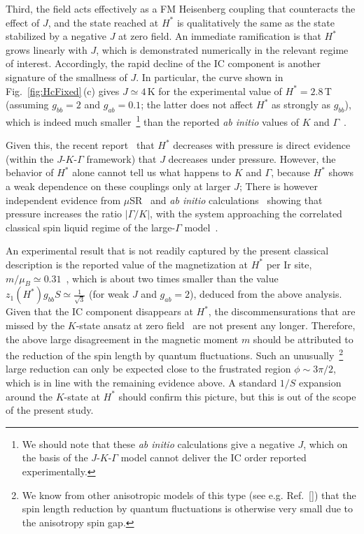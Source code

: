 \documentclass[prx,aps,groupedaddress,twocolumn]{revtex4-1}
\begin{document}
Third, the field acts effectively as a FM Heisenberg coupling that counteracts the effect of $J$, and the state reached at $H^\ast$ is qualitatively the same as the state stabilized by a negative $J$ at zero field.  An immediate ramification is that $H^\ast$ grows linearly with $J$, which is demonstrated numerically in the relevant regime of interest. 
%
Accordingly, the rapid decline of the IC component is another  signature of the smallness of $J$. 
%
In particular, the curve shown in Fig.~\ref{fig:HcFixed}\,(c) gives $J\!\simeq\!4$\,K for the experimental value of $H^\ast\!=\!2.8$\,T~\cite{Ruiz2017} (assuming $g_{bb}\!=\!2$ and $g_{ab}\!=\!0.1$; the latter does not affect $H^\ast$ as strongly as $g_{bb}$), which is indeed much smaller~\footnote{We should note that these {\it ab initio} calculations give a negative $J$, which on the basis of the $J$-$K$-$\Gamma$ model cannot deliver the IC order reported experimentally.} than the reported {\it ab initio} values of $K$ and $\Gamma$~\cite{Katukuri2016,KimKimKee2016, Tsirlin2018}.
%


Given this, the recent report~\cite{Tsirlin2018} that $H^\ast$ decreases with pressure is direct evidence (within the $J$-$K$-$\Gamma$ framework) that $J$ decreases under pressure. 
%
However, the behavior of $H^\ast$ alone cannot tell us what happens to $K$ and $\Gamma$, because $H^\ast$ shows a weak dependence on these couplings only at larger $J$; There is however independent evidence from $\mu$SR~\cite{Tsirlin2018} and {\it ab initio} calculations~\cite{KimKimKee2016,Tsirlin2018} showing that pressure increases the ratio $|\Gamma/K|$, with the system approaching the correlated classical spin liquid regime of the large-$\Gamma$ model~\cite{IoannisGamma}.

An experimental result that is not readily captured by the present classical description is the reported value of the magnetization at $H^\ast$ per Ir site, $m/\mu_B\!\simeq\!0.31$~\cite{Ruiz2017}, which is about two times smaller than the value $z_1(H^\ast)g_{bb} S\!\simeq\!\frac{1}{\sqrt{3}}$ (for weak $J$ and $g_{ab}\!=\!2$), deduced from the above analysis. 
%
Given that the IC component disappears at $H^\ast$, the discommensurations that are missed by the $K$-state ansatz at zero field~\cite{Sam2018} are not present any longer. 
%
Therefore, the above large disagreement in the magnetic moment $m$ should be attributed to the reduction of the spin length by quantum fluctuations. 
%
Such an unusually~\footnote{We know from other anisotropic models of this type (see e.g. Ref.~[]) that the spin length reduction by quantum fluctuations is otherwise very small due to the anisotropy spin gap.} large reduction can only be expected close to the frustrated region $\phi\!\sim\!3\pi/2$, which is in line with the remaining evidence above. A standard $1/S$ expansion around the $K$-state at $H^\ast$ should confirm this picture, but this is out of the scope of the present study.  
\end{document}
